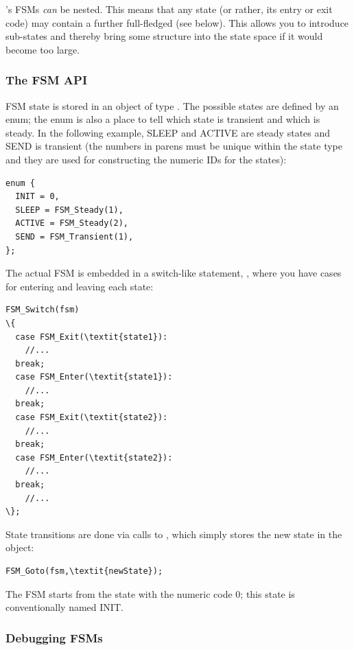 {\opp}'s FSMs \textit{can} be nested. This means
that any state (or rather, its entry or exit code) may contain a
further full-fledged  (see below). This allows you
to introduce sub-states and thereby bring some structure into the
state space if it would become too large.


\subsubsection{The FSM API}


FSM state is stored in an object of type . The possible states
are defined by an enum; the enum is also a place to tell which
state is transient and which is steady. In the following example, SLEEP
and ACTIVE are steady states and SEND is transient (the numbers
in parens must be unique within the state type and they are used
for constructing the numeric IDs for the states):

\begin{verbatim}
enum {
  INIT = 0,
  SLEEP = FSM_Steady(1),
  ACTIVE = FSM_Steady(2),
  SEND = FSM_Transient(1),
};
\end{verbatim}



The actual FSM is embedded in a switch-like statement,
, where you have cases for entering and leaving
each state:


\begin{Verbatim}[commandchars=\\\{\}]
FSM_Switch(fsm)
\{
  case FSM_Exit(\textit{state1}):
    //...
  break;
  case FSM_Enter(\textit{state1}):
    //...
  break;
  case FSM_Exit(\textit{state2}):
    //...
  break;
  case FSM_Enter(\textit{state2}):
    //...
  break;
    //...
\};
\end{Verbatim}


State transitions are done via calls to
, which simply stores the new state in the
 object:

\begin{Verbatim}[commandchars=\\\{\}]
FSM_Goto(fsm,\textit{newState});
\end{Verbatim}

The FSM starts from the state with the numeric code 0; this state
is conventionally named INIT.


\subsubsection{Debugging FSMs}

